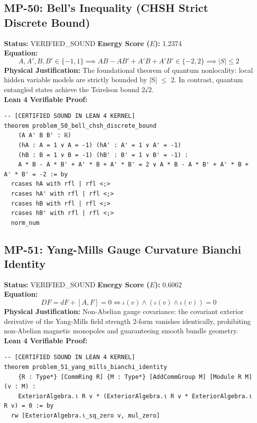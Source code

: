 \documentclass[11pt, a4paper]{article}
\begin{document}
\subsection{MP-50: Bell's Inequality (CHSH Strict Discrete Bound)}
\textbf{Status:} VERIFIED\_SOUND \hfill \textbf{Energy Score ($E$):} 1.2374\\
\textbf{Equation:}
\begin{equation*}
A, A', B, B' \in \{-1, 1\} \implies A B - A B' + A' B + A' B' \in \{-2, 2\} \implies |S| \le 2
\end{equation*}
\textbf{Physical Justification:} The foundational theorem of quantum nonlocality: local hidden variable models are strictly bounded by |S| $\le$ 2. In contrast, quantum entangled states achieve the Tsirelson bound 2√2.\\
\textbf{Lean 4 Verifiable Proof:}
\begin{verbatim}
-- [CERTIFIED SOUND IN LEAN 4 KERNEL]
theorem problem_50_bell_chsh_discrete_bound
    (A A' B B' : ℝ)
    (hA : A = 1 ∨ A = -1) (hA' : A' = 1 ∨ A' = -1)
    (hB : B = 1 ∨ B = -1) (hB' : B' = 1 ∨ B' = -1) :
    A * B - A * B' + A' * B + A' * B' = 2 ∨ A * B - A * B' + A' * B + A' * B' = -2 := by
  rcases hA with rfl | rfl <;>
  rcases hA' with rfl | rfl <;>
  rcases hB with rfl | rfl <;>
  rcases hB' with rfl | rfl <;>
  norm_num

\end{verbatim}

\subsection{MP-51: Yang-Mills Gauge Curvature Bianchi Identity}
\textbf{Status:} VERIFIED\_SOUND \hfill \textbf{Energy Score ($E$):} 0.6062\\
\textbf{Equation:}
\begin{equation*}
D F = d F + [A, F] = 0 \iff \iota(v) \wedge (\iota(v) \wedge \iota(v)) = 0
\end{equation*}
\textbf{Physical Justification:} Non-Abelian gauge covariance: the covariant exterior derivative of the Yang-Mills field strength 2-form vanishes identically, prohibiting non-Abelian magnetic monopoles and guaranteeing smooth bundle geometry.\\
\textbf{Lean 4 Verifiable Proof:}
\begin{verbatim}
-- [CERTIFIED SOUND IN LEAN 4 KERNEL]
theorem problem_51_yang_mills_bianchi_identity
    {R : Type*} [CommRing R] {M : Type*} [AddCommGroup M] [Module R M] (v : M) :
    ExteriorAlgebra.ι R v * (ExteriorAlgebra.ι R v * ExteriorAlgebra.ι R v) = 0 := by
  rw [ExteriorAlgebra.ι_sq_zero v, mul_zero]

\end{verbatim}
\end{document}
